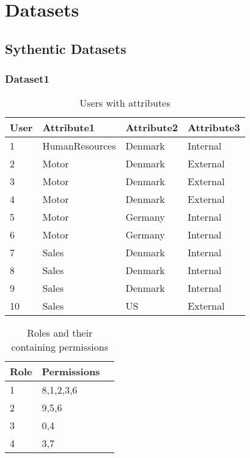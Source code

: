 \chapter{Datasets}
\section{Sythentic Datasets}
\label{sec:A_syn_datasets}
	\subsection{Dataset1}
		\begin{table}[H]
			\centering
			\caption{Users with attributes}
			\label{tab:dataset1_users}
			\begin{tabular}{|l|l|l|l|}
				\hline
				\rowcolor[HTML]{EFEFEF} 
				User & Attribute1     & Attribute2 & Attribute3 \\ \hline
				1    & HumanResources & Denmark    & Internal   \\ \hline
				2    & Motor          & Denmark    & External   \\ \hline
				3    & Motor          & Denmark    & External   \\ \hline
				4    & Motor          & Denmark    & External   \\ \hline
				5    & Motor          & Germany    & Internal   \\ \hline
				6    & Motor          & Germany    & Internal   \\ \hline
				7    & Sales          & Denmark    & Internal   \\ \hline
				8    & Sales          & Denmark    & Internal   \\ \hline
				9    & Sales          & Denmark    & Internal   \\ \hline
				10   & Sales          & US         & External   \\ \hline
			\end{tabular}
		\end{table}
		\begin{table}[H]
			\centering
			\caption{Roles and their containing permissions}
			\label{tab:dataset1_roles}
			\begin{tabular}{|l|l|l|}
				\hline
				\rowcolor[HTML]{EFEFEF} 
				Role & Permissions \\ \hline
				1    & 8,1,2,3,6   \\ \hline
				2    & 9,5,6       \\ \hline
				3    & 0,4         \\ \hline
				4    & 3,7         \\ \hline
			\end{tabular}
		\end{table}
		
